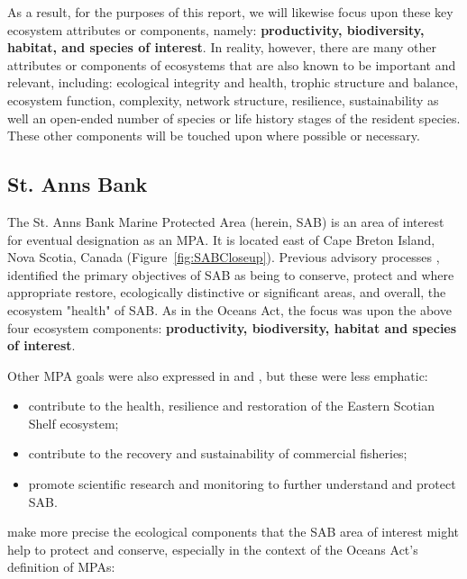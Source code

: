 \documentclass[letterpaper,portrait,11pt]{scrartcl}
\numberwithin{equation}{section}    %
\numberwithin{figure}{section}    %
\numberwithin{table}{section}       %
\begin{document}
As a result, for the purposes of this report, we will likewise focus upon these key ecosystem attributes or components, namely: \textbf{productivity, biodiversity, habitat, and  species of interest}. In reality, however, there are many other attributes or components of ecosystems that are also known to be important and relevant, including: ecological integrity and health, trophic structure and balance, ecosystem function, complexity, network structure, resilience, sustainability as well an open-ended number of species or life history stages of the resident species. These other components will be touched upon where possible or necessary. 

\subsection{St. Anns Bank}
The St. Anns Bank Marine Protected Area (herein, SAB) is an area of interest for eventual designation as an MPA. It is located east of Cape Breton Island, Nova Scotia, Canada (Figure~\ref{fig:SABCloseup}). Previous advisory processes \parencites{DFO:2012:conservation, Kenchington:2013:sab}, identified the primary objectives of SAB as being to conserve, protect and where appropriate restore, ecologically distinctive or significant areas, and overall, the ecosystem "health" of SAB. As in the Oceans Act, the focus was upon the above four ecosystem components: \textbf{productivity, biodiversity, habitat and species of interest}.

Other MPA goals were also expressed in \textcite{DFO:2012:conservation} and \textcite{Kenchington:2013:sab}, but these were less emphatic:

\begin{itemize}
	\item contribute to the health, resilience and restoration of the Eastern Scotian Shelf ecosystem;
	\item contribute to the recovery and sustainability of commercial fisheries; 
	\item promote scientific research and monitoring to further understand and protect SAB.
\end{itemize}

\textcite{Ford:2013:sab} make more precise the ecological components that the SAB area of interest might help to protect and conserve, especially in the context of the Oceans Act's definition of MPAs:
\end{document}
